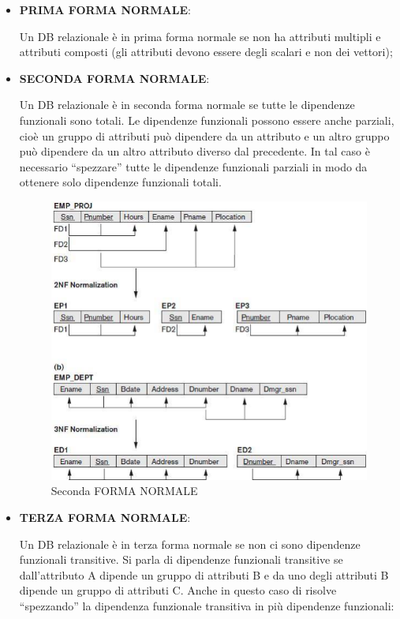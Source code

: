 \begin{itemize}


\item{\textbf{PRIMA FORMA NORMALE}}:

Un DB relazionale è in prima forma normale se non ha attributi multipli e attributi composti (gli attributi devono essere degli scalari e non dei vettori);

\item{\textbf{SECONDA FORMA NORMALE}}:

Un DB relazionale è in seconda forma normale se tutte le dipendenze funzionali sono totali. 
Le dipendenze funzionali possono essere anche parziali, cioè un gruppo di attributi può dipendere da un attributo e un altro gruppo può dipendere da un altro attributo diverso dal precedente. 
In tal caso è necessario “spezzare” tutte le dipendenze funzionali parziali in modo da ottenere solo dipendenze funzionali totali.   

\begin{center}
\begin{figure}[H]
\centering
\includegraphics[scale=0.8]{figures/2ndnormal.png}
\caption{Seconda FORMA NORMALE}
\end{figure}
\end{center}

\item{\textbf{TERZA FORMA NORMALE}}:

Un DB relazionale è in terza forma normale se non ci sono dipendenze funzionali transitive. 
Si parla di dipendenze funzionali transitive se dall’attributo A dipende un gruppo di attributi B e da uno degli attributi B dipende un gruppo di attributi C. 
Anche in questo caso di risolve “spezzando” la dipendenza funzionale transitiva in più dipendenze funzionali:


\end{itemize}
